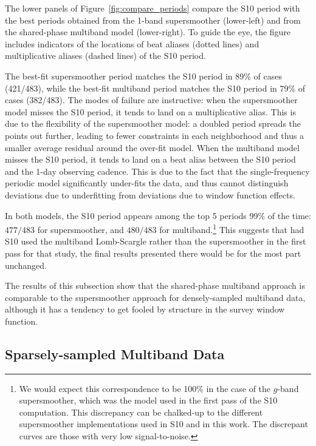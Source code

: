 \documentclass[12pt,preprint]{aastex}
\newcommand{\Fig}[1]{Figure~\ref{fig:#1}}
\newcommand{\fig}[1]{\Fig{#1}}
\begin{document}
The lower panels of \fig{compare_periods} compare the S10 period with the best periods obtained from the 1-band supersmoother (lower-left) and from the shared-phase multiband model (lower-right). To guide the eye, the figure includes indicators of the locations of beat aliases (dotted lines) and multiplicative aliases (dashed lines) of the S10 period.

The best-fit supersmoother period matches the S10 period in 89\% of cases (421/483), while the best-fit multiband period matches the S10 period in 79\% of cases (382/483). The modes of failure are instructive: when the supersmoother model misses the S10 period, it tends to land on a multiplicative alias. This is due to the flexibility of the supersmoother model: a doubled period spreads the points out further, leading to fewer constraints in each neighborhood and thus a smaller average residual around the over-fit model.  When the multiband model misses the S10 period, it tends to land on a beat alias between the S10 period and the 1-day observing cadence. This is due to the fact that the single-frequency periodic model significantly under-fits the data, and thus cannot distinguish deviations due to underfitting from deviations due to window function effects.

In both models, the S10 period appears among the top 5 periods 99\% of the time: $477/483$ for supersmoother, and $480/483$ for multiband.\footnote{We would expect this correspondence to be 100\% in the case of the $g$-band supersmoother, which was the model used in the first pass of the S10 computation. This discrepancy can be chalked-up to the different supersmoother implementations used in S10 and in this work. The discrepant curves are those with very low signal-to-noise.} This suggests that had S10 used the multiband Lomb-Scargle rather than the supersmoother in the first pass for that study, the final results presented there would be for the most part unchanged.

The results of this subsection show that the shared-phase multiband approach is comparable to the supersmoother approach for densely-sampled multiband data, although it has a tendency to get fooled by structure in the survey window function.

\subsection{Sparsely-sampled Multiband Data}
\end{document}

